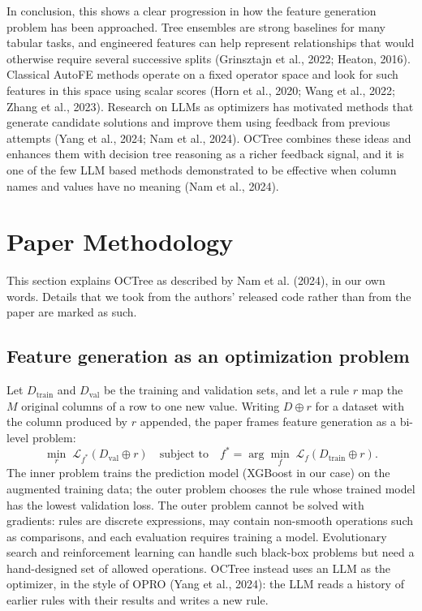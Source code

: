 \documentclass[11pt]{article}
\begin{document}
In conclusion, this shows a clear progression in how the feature generation problem has been
approached. Tree ensembles are strong baselines for many tabular tasks, and engineered features can
help represent relationships that would otherwise require several successive splits (Grinsztajn et
al., 2022; Heaton, 2016). Classical AutoFE methods operate on a fixed operator space and look for
such features in this space using scalar scores (Horn et al., 2020; Wang et al., 2022; Zhang et al.,
2023). Research on LLMs as optimizers has motivated methods that generate candidate solutions and
improve them using feedback from previous attempts (Yang et al., 2024; Nam et al., 2024). OCTree
combines these ideas and enhances them with decision tree reasoning as a richer feedback signal, and
it is one of the few LLM based methods demonstrated to be effective when column names and values
have no meaning (Nam et al., 2024).

\section{Paper Methodology}\label{sec:method}

This section explains OCTree as described by Nam et al. (2024), in our own words. Details that we
took from the authors' released code rather than from the paper are marked as such.

\subsection{Feature generation as an optimization problem}
Let $D_{\text{train}}$ and $D_{\text{val}}$ be the training and validation sets, and let a rule $r$
map the $M$ original columns of a row to one new value. Writing $D\oplus r$ for a dataset with the
column produced by $r$ appended, the paper frames feature generation as a bi-level problem:
\begin{equation}
  \min_{r}\; \mathcal{L}_{f^{*}}\!\left(D_{\text{val}}\oplus r\right)
  \quad\text{subject to}\quad
  f^{*}=\arg\min_{f}\; \mathcal{L}_{f}\!\left(D_{\text{train}}\oplus r\right).
  \label{eq:bilevel}
\end{equation}
The inner problem trains the prediction model (XGBoost in our case) on the augmented training data;
the outer problem chooses the rule whose trained model has the lowest validation loss. The outer
problem cannot be solved with gradients: rules are discrete expressions, may contain non-smooth
operations such as comparisons, and each evaluation requires training a model. Evolutionary search
and reinforcement learning can handle such black-box problems but need a hand-designed set of
allowed operations. OCTree instead uses an LLM as the optimizer, in the style of OPRO (Yang et al.,
2024): the LLM reads a history of earlier rules with their results and writes a new rule.
\end{document}
